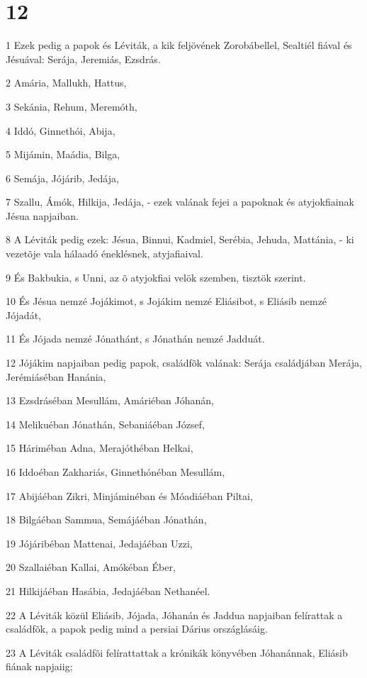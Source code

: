 \chapter{12}

\par 1 Ezek pedig a papok és Léviták, a kik feljövének Zorobábellel, Sealtiél fiával és Jésuával: Serája, Jeremiás, Ezsdrás.
\par 2 Amária, Mallukh, Hattus,
\par 3 Sekánia, Rehum, Meremóth,
\par 4 Iddó, Ginnethói, Abija,
\par 5 Mijámin, Maádia, Bilga,
\par 6 Semája, Jójárib, Jedája,
\par 7 Szallu, Ámók, Hilkija, Jedája, - ezek valának fejei a papoknak és atyjokfiainak Jésua napjaiban.
\par 8 A Léviták pedig ezek: Jésua, Binnui, Kadmiel, Serébia, Jehuda, Mattánia, - ki vezetõje vala hálaadó éneklésnek, atyjafiaival.
\par 9 És Bakbukia, s Unni, az õ atyjokfiai velök szemben, tisztök szerint.
\par 10 És Jésua nemzé Jojákimot, s Jojákim nemzé Eliásibot, s Eliásib nemzé Jójadát,
\par 11 És Jójada nemzé Jónathánt, s Jónathán nemzé Jadduát.
\par 12 Jójákim napjaiban pedig papok, családfõk valának: Serája családjában Merája, Jerémiáséban Hanánia,
\par 13 Ezsdráséban Mesullám, Amáriéban Jóhanán,
\par 14 Melikuéban Jónathán, Sebaniáéban József,
\par 15 Háriméban Adna, Merajóthéban Helkai,
\par 16 Iddoéban Zakhariás, Ginnethónéban Mesullám,
\par 17 Abijáéban Zikri, Minjáminéban és Móadiáéban Piltai,
\par 18 Bilgáéban Sammua, Semájáéban Jónathán,
\par 19 Jójáribéban Mattenai, Jedajáéban Uzzi,
\par 20 Szallaiéban Kallai, Amókéban Éber,
\par 21 Hilkijáéban Hasábia, Jedajáéban Nethanéel.
\par 22 A Léviták közül Eliásib, Jójada, Jóhanán és Jaddua napjaiban felírattak a családfõk, a papok pedig mind a persiai Dárius országlásáig.
\par 23 A Léviták családfõi felírattattak a krónikák könyvében Jóhanánnak, Eliásib fiának  napjaiig;

